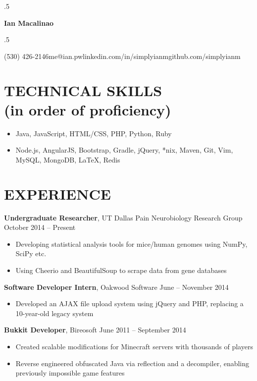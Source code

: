 \documentclass{res} %
\makeatletter
\def\ULurl@#1{\hyper@linkurl{\ULurl@@{#1}}{#1}}
\DeclareRobustCommand*\ULurl{\hyper@normalise\ULurl@}
\newcommand*{\its}{\hspace{0.8cm}}
\makeatother
\begin{document}
\moveleft.5\hoffset\centerline{\Huge\bf Ian Macalinao}
\bigskip
\moveleft.5\hoffset\centerline{(530) 426-2146\its{}me@ian.pw\its{}\ULurl{http://ian.pw}\its{}linkedin.com/in/simplyianm\its{}github.com/simplyianm}

\section{TECHNICAL SKILLS \\ \textnormal{(in order of proficiency)}} 

\begin{itemize} \itemsep -2pt
  \item Java, JavaScript, HTML/CSS, PHP, Python, Ruby
  \item Node.js, AngularJS, Bootstrap, Gradle, jQuery, *nix, Maven, Git, Vim, MySQL, MongoDB, \LaTeX, Redis
\end{itemize}

\section{EXPERIENCE}

{\bf Undergraduate Researcher}, UT Dallas Pain Neurobiology Research Group \hfill October 2014 -- Present
\begin{itemize} \itemsep -2pt
  \item Developing statistical analysis tools for mice/human genomes using NumPy, SciPy etc.
  \item Using Cheerio and BeautifulSoup to scrape data from gene databases
\end{itemize}

{\bf Software Developer Intern}, Oakwood Software \hfill June -- November 2014
\begin{itemize} \itemsep -2pt
  \item Developed an AJAX file upload system using jQuery and PHP, replacing a 10-year-old legacy system
\end{itemize}

{\bf Bukkit Developer}, Bireosoft \hfill June 2011 -- September 2014
\begin{itemize} \itemsep -2pt
  \item Created scalable modifications for Minecraft servers with thousands of players
  \item Reverse engineered obfuscated Java via reflection and a decompiler, enabling previously impossible game features
\end{itemize}
\end{document}
